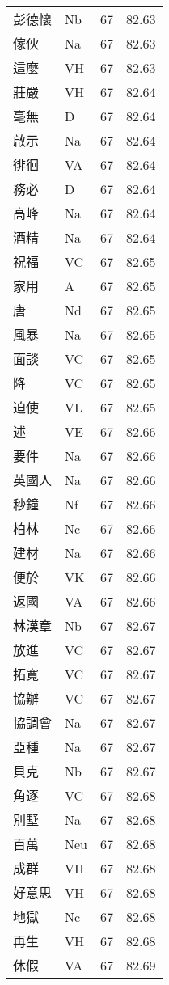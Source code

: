 \documentclass[twocolumn]{book}
\begin{document}
\begin{supertabular}{llrr}
彭德懷 & Nb & 67 &  82.63\\
傢伙 & Na & 67 &  82.63\\
這麼 & VH & 67 &  82.63\\
莊嚴 & VH & 67 &  82.64\\
毫無 & D & 67 &  82.64\\
啟示 & Na & 67 &  82.64\\
徘徊 & VA & 67 &  82.64\\
務必 & D & 67 &  82.64\\
高峰 & Na & 67 &  82.64\\
酒精 & Na & 67 &  82.64\\
祝福 & VC & 67 &  82.65\\
家用 & A & 67 &  82.65\\
唐 & Nd & 67 &  82.65\\
風暴 & Na & 67 &  82.65\\
面談 & VC & 67 &  82.65\\
降 & VC & 67 &  82.65\\
迫使 & VL & 67 &  82.65\\
述 & VE & 67 &  82.66\\
要件 & Na & 67 &  82.66\\
英國人 & Na & 67 &  82.66\\
秒鐘 & Nf & 67 &  82.66\\
柏林 & Nc & 67 &  82.66\\
建材 & Na & 67 &  82.66\\
便於 & VK & 67 &  82.66\\
返國 & VA & 67 &  82.66\\
林漢章 & Nb & 67 &  82.67\\
放進 & VC & 67 &  82.67\\
拓寬 & VC & 67 &  82.67\\
協辦 & VC & 67 &  82.67\\
協調會 & Na & 67 &  82.67\\
亞種 & Na & 67 &  82.67\\
貝克 & Nb & 67 &  82.67\\
角逐 & VC & 67 &  82.68\\
別墅 & Na & 67 &  82.68\\
百萬 & Neu & 67 &  82.68\\
成群 & VH & 67 &  82.68\\
好意思 & VH & 67 &  82.68\\
地獄 & Nc & 67 &  82.68\\
再生 & VH & 67 &  82.68\\
休假 & VA & 67 &  82.69\\

\end{supertabular}
\end{document}
